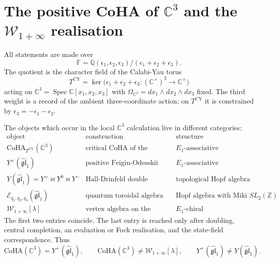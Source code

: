 \providecommand{\C}{\mathbb{C}}
\providecommand{\Q}{\mathbb{Q}}
\providecommand{\Z}{\mathbb{Z}}
\providecommand{\CoHA}{\mathrm{CoHA}}
\providecommand{\Hilb}{\mathrm{Hilb}}
\providecommand{\Perf}{\mathrm{Perf}}
\providecommand{\Rep}{\mathrm{Rep}}
\providecommand{\Sh}{\mathrm{Sh}}
\providecommand{\gglone}{\widehat{\mathfrak{gl}}_1}
\providecommand{\gghone}{\widehat{\widehat{\mathfrak{gl}}}_1}
\providecommand{\Wilpha}{\mathcal{W}_{1+\infty}}
\providecommand{\YFull}{Y}
\providecommand{\Yp}{Y^{+}}
\providecommand{\Ym}{Y^{-}}
\providecommand{\Yz}{Y^{0}}
\providecommand{\MO}{\mathrm{MO}}
\providecommand{\cZ}{\mathcal{Z}}

\section*{The positive CoHA of \texorpdfstring{$\C^3$}{C3} and the
\texorpdfstring{$\mathcal W_{1+\infty}$}{W1+infty} realisation}
\label{sec:coha-c3-w-infty-positive-half}

All statements are made over
\[
  \mathbb F
  =
  \Q(\epsilon_1,\epsilon_2,\epsilon_3)/
  (\epsilon_1+\epsilon_2+\epsilon_3).
\]
The quotient is the character field of the Calabi-Yau torus
\[
 T^{\mathrm{CY}}
 =
 \ker\bigl(\epsilon_1+\epsilon_2+\epsilon_3:
 (\C^\times)^3\to \C^\times\bigr)
\]
acting on \(\C^3=\operatorname{Spec}\C[x_1,x_2,x_3]\) with
\(\Omega_{\C^3}=dx_1\wedge dx_2\wedge dx_3\) fixed.  The third
weight is a record of the ambient three-coordinate action; on
\(T^{\mathrm{CY}}\) it is constrained by
\(\epsilon_3=-\epsilon_1-\epsilon_2\).

The objects which occur in the local \(\C^3\) calculation live in
different categories:
\[
\begin{array}{l|l|l}
\text{object} & \text{construction} & \text{structure} \\\hline
\CoHA_{T^{\mathrm{CY}}}(\C^3) & \text{critical CoHA of the Jordan triple loop quiver} &
E_1\text{-associative} \\
\Yp(\gglone) & \text{positive Feigin-Odesskii shuffle half} &
E_1\text{-associative} \\
\YFull(\gglone)=\Yp\bowtie\Yz\bowtie\Ym & \text{Hall-Drinfeld double} &
\text{topological Hopf algebra} \\
\mathcal E_{q_1,q_2,q_3}(\gglone) & \text{quantum toroidal algebra} &
\text{Hopf algebra with Miki }SL_2(\Z) \\
\Wilpha[\lambda] & \text{vertex algebra on the spectral curve} &
E_1\text{-chiral}
\end{array}
\]
The first two entries coincide.  The last entry is reached only after
doubling, central completion, an evaluation or Fock realisation, and
the state-field correspondence.  Thus
\[
  \CoHA(\C^3)=\Yp(\gglone),
  \qquad
  \CoHA(\C^3)\neq \Wilpha[\lambda],
  \qquad
  \Yp(\gglone)\neq \YFull(\gglone).
\]

